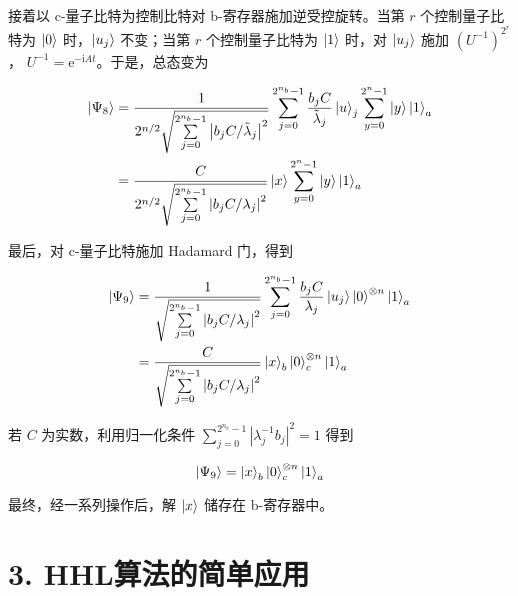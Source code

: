 \documentclass[aps,prl,twocolumn,groupedaddress]{revtex4-2}
\begin{document}
接着以 c-量子比特为控制比特对 b-寄存器施加逆受控旋转。当第 $r$ 个控制量子比特为 $\ket{0}$ 时，$\ket{u_j}$ 不变；当第 $r$ 个控制量子比特为 $\ket{1}$ 时，对 $\ket{u_j}$ 施加 $\left(U^{-1} \right)^{2^r}$， $U^{-1}=\mathrm{e}^{-\mathrm{i}At}$。于是，总态变为

$$
\begin{aligned}
\ket{\Psi_8}
&=\frac{1 }{2^{n/2}\sqrt{\sum\limits_{j=0}^{2^{n_b}-1}\left|b_j C/\tilde{\lambda}_j \right|^2} } \sum_{j=0}^{2^{n_b}-1}\frac{b_j C }{\tilde{\lambda}_j }\ket{u}_j \sum_{y=0}^{2^n-1}\ket{y}\ket{1}_a \\
&=\frac{C }{2^{n/2}\sqrt{\sum\limits_{j=0}^{2^{n_b}-1}\left|b_j C/\lambda_j \right|^2} } \ket{x} \sum_{y=0}^{2^n-1} \ket{y}\ket{1}_a
\end{aligned}
$$

最后，对 c-量子比特施加 Hadamard 门，得到

$$
\begin{aligned}
\ket{\Psi_9}
&=\frac{1 }{\sqrt{\sum\limits_{j=0}^{2^{n_b}-1}\left|b_j C/\lambda_j \right|^2} }\sum_{j=0}^{2^{n_b}-1} \frac{b_j C }{\lambda_j } \ket{u_j}\ket{0}^{\otimes n}\ket{1}_a \\
&=\frac{C }{\sqrt{\sum\limits_{j=0}^{2^{n_b}-1}\left|b_j C/\lambda_j \right|^2} }\ket{x}_b\ket{0}_c^{\otimes n}\ket{1}_a
\end{aligned}
$$

若 $C$ 为实数，利用归一化条件 $\displaystyle{\sum_{j=0}^{2^{n_b}-1}\left|\lambda_j^{-1}b_j \right|^2=1 }$ 得到

$$
\ket{\Psi_9}
=\ket{x}_b\ket{0}_c^{\otimes n}\ket{1}_a
$$

最终，经一系列操作后，解 $\ket{x}$ 储存在 b-寄存器中。

\section{3. HHL算法的简单应用}


%
\end{document}
